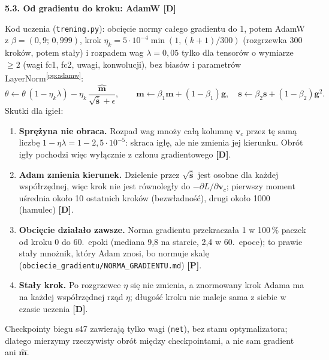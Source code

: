 \documentclass[a4paper,11pt]{article}
\newcommand{\stD}{\textcolor{dok}{\textsf{\textbf{[D]}}}}
\newcommand{\stP}{\textcolor{pom}{\textsf{\textbf{[P]}}}}
\newcommand{\pp}[1]{\textsuperscript{\ref{pp:#1}}}
\newcommand{\elem}[1]{\par\medskip\noindent\textbf{#1}\par\nopagebreak}
\begin{document}
\elem{5.3. Od gradientu do kroku: AdamW \stD}
Kod uczenia (\texttt{trening.py}): obcięcie normy całego gradientu do 1, potem AdamW z $\beta=(0{,}9;\,0{,}999)$, krok
$\eta_k=5\cdot10^{-4}\min(1,(k+1)/300)$ (rozgrzewka 300 kroków, potem stały) i rozpadem wag $\lambda=0{,}05$ tylko dla tensorów
o wymiarze $\ge2$ (wagi fc1, fc2, uwagi, konwolucji), bez biasów i parametrów LayerNorm\pp{adamw}:
\begin{equation}
\theta\leftarrow\theta\,(1-\eta_k\lambda)-\eta_k\,\frac{\hat{\bm m}}{\sqrt{\hat{\bm s}}+\epsilon},\qquad
\bm m\leftarrow\beta_1\bm m+(1-\beta_1)\bm g,\quad \bm s\leftarrow\beta_2\bm s+(1-\beta_2)\bm g^{2}.
\end{equation}
Skutki dla igieł:
\begin{enumerate}
\item \textbf{Sprężyna nie obraca.} Rozpad wag mnoży całą kolumnę $\bm v_c$ przez tę samą liczbę $1-\eta\lambda=1-2{,}5\cdot10^{-5}$:
skraca igłę, ale nie zmienia jej kierunku. Obrót igły pochodzi więc wyłącznie z członu gradientowego \stD.
\item \textbf{Adam zmienia kierunek.} Dzielenie przez $\sqrt{\hat{\bm s}}$ jest osobne dla każdej współrzędnej, więc krok nie jest
równoległy do $-\partial L/\partial\bm v_c$; pierwszy moment uśrednia około 10 ostatnich kroków (bezwładność), drugi około 1000 (hamulec) \stD.
\item \textbf{Obcięcie działało zawsze.} Norma gradientu przekraczała 1 w 100\,\% paczek od kroku 0 do 60.~epoki (mediana 9,8 na starcie,
2,4 w 60.~epoce); to prawie stały mnożnik, który Adam znosi, bo normuje skalę (\texttt{obciecie\_gradientu/NORMA\_GRADIENTU.md}) \stP.
\item \textbf{Stały krok.} Po rozgrzewce $\eta$ się nie zmienia, a znormowany krok Adama ma na każdej współrzędnej rząd $\eta$;
długość kroku nie maleje sama z siebie w czasie uczenia \stD.
\end{enumerate}
Checkpointy biegu s47 zawierają tylko wagi (\texttt{net}), bez stanu optymalizatora; dlatego mierzymy rzeczywisty obrót między
checkpointami, a nie sam gradient ani $\hat{\bm m}$.
\end{document}
